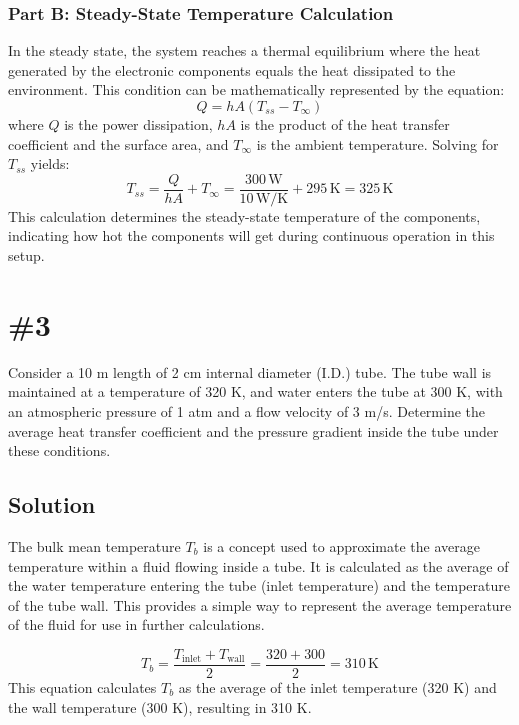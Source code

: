 \documentclass{article}
\numberwithin{equation}{section}
\begin{document}
\subsubsection*{Part B: Steady-State Temperature Calculation}
In the steady state, the system reaches a thermal equilibrium where the heat generated by the electronic components equals the heat dissipated to the environment. This condition can be mathematically represented by the equation:
\begin{equation}
    Q = hA(T_{ss} - T_{\infty})
\end{equation}
where \(Q\) is the power dissipation, \(hA\) is the product of the heat transfer coefficient and the surface area, and \(T_{\infty}\) is the ambient temperature. Solving for \(T_{ss}\) yields:
\begin{equation}
    T_{ss} = \frac{Q}{hA} + T_{\infty} = \frac{300 \, \text{W}}{10 \, \text{W/K}} + 295 \, \text{K} = 325 \, \text{K}
\end{equation}
This calculation determines the steady-state temperature of the components, indicating how hot the components will get during continuous operation in this setup.


\newpage
\section{\#3}
Consider a 10 m length of 2 cm internal diameter (I.D.) tube. The tube wall is maintained at a temperature of 320 K, and water enters the tube at 300 K, with an atmospheric pressure of 1 atm and a flow velocity of 3 m/s. Determine the average heat transfer coefficient and the pressure gradient inside the tube under these conditions.

\subsection*{Solution}
The bulk mean temperature \( T_b \) is a concept used to approximate the average temperature within a fluid flowing inside a tube. It is calculated as the average of the water temperature entering the tube (inlet temperature) and the temperature of the tube wall. This provides a simple way to represent the average temperature of the fluid for use in further calculations.

\begin{equation}
    T_b = \frac{T_{\text{inlet}} + T_{\text{wall}}}{2} = \frac{320 + 300}{2} = 310\, \text{K}
\end{equation}
This equation calculates \( T_b \) as the average of the inlet temperature (320 K) and the wall temperature (300 K), resulting in 310 K.
\end{document}

